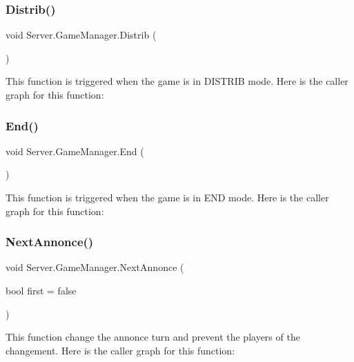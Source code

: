 \subsubsection{\texorpdfstring{Distrib()}{Distrib()}}
{\footnotesize\ttfamily void Server.\+Game\+Manager.\+Distrib (\begin{DoxyParamCaption}{ }\end{DoxyParamCaption})\hspace{0.3cm}{\ttfamily [inline]}}

This function is triggered when the game is in D\+I\+S\+T\+R\+IB mode. Here is the caller graph for this function\+:
\mbox{\label{class_server_1_1_game_manager_a7e771aa3a76446d77d872386fb4984d9}} 
\subsubsection{\texorpdfstring{End()}{End()}}
{\footnotesize\ttfamily void Server.\+Game\+Manager.\+End (\begin{DoxyParamCaption}{ }\end{DoxyParamCaption})\hspace{0.3cm}{\ttfamily [inline]}}

This function is triggered when the game is in E\+ND mode. Here is the caller graph for this function\+:
\mbox{\label{class_server_1_1_game_manager_a157fc5f3ae7eba10807e18e682f0403a}} 
\subsubsection{\texorpdfstring{Next\+Annonce()}{NextAnnonce()}}
{\footnotesize\ttfamily void Server.\+Game\+Manager.\+Next\+Annonce (\begin{DoxyParamCaption}\item[{bool}]{first = {\ttfamily false} }\end{DoxyParamCaption})\hspace{0.3cm}{\ttfamily [inline]}}

This function change the annonce turn and prevent the players of the changement. Here is the caller graph for this function\+:
\mbox{\label{class_server_1_1_game_manager_a94b83f44ca6b2f3a70d9f5ad0af19696}} 
